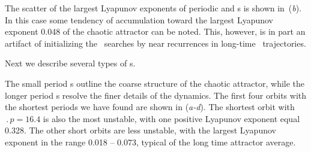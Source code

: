 The scatter of the largest Lyapunov exponents
of periodic and \rpo s is shown in \,(\textit{b}).
In this case some tendency of accumulation toward the largest
Lyapunov exponent 0.048 of the chaotic attractor
can be noted.  This, however, is in part an artifact of initializing
the \rpo\ searches by near recurrences in long-time \statesp\
trajectories.

Next we describe several types of \rpo s.


The small period \rpo s outline the coarse structure of the chaotic
attractor, while the longer period \rpo s resolve the finer details
of the dynamics.
The first four orbits with the shortest periods we have found are
shown in \reffig{f:ks22rpos}(\textit{a-d}).  The shortest orbit with
$\period{p} = 16.4$ is also the most unstable, with one positive
Lyapunov exponent equal 0.328.  The other short orbits are less
unstable, with the largest Lyapunov exponent %
in the range
0.018 -- 0.073, typical of the long time attractor average.

